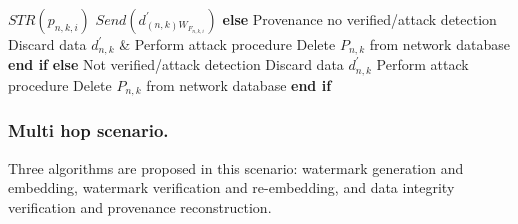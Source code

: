 \documentclass{llncs}
\begin{document}
\begin{algorithm}[!htbp]
\begin{algorithmic}[1]
    \State \hspace{20pt} $STR(p_{n,k,i})$  
    \State \hspace{20pt} $Send(d^{'}_{(n,k)W_{F_{n,k,i}}})$
    \State \hspace{10pt} \textbf{else} 
    \State \hspace{20pt} Provenance no verified/attack detection
    \State \hspace{20pt} Discard data $d^{'}_{n,k}$ \& Perform attack procedure
    \State \hspace{20pt} Delete $P_{n,k}$ from network database
    \State \hspace{10pt} \textbf{end if}
    \State \textbf{else} 
    \State \hspace{10pt} Not verified/attack detection
    \State \hspace{10pt} Discard data $d^{'}_{n,k}$
    \State \hspace{10pt} Perform attack procedure
    \State \hspace{10pt} Delete $P_{n,k}$ from network database
    \State \textbf{end if}
    \EndProcedure
    \end{algorithmic}
    \end{algorithm}

    
    



\subsubsection{Multi hop scenario.}
Three algorithms are proposed in this scenario: watermark generation and embedding, watermark verification and re-embedding, and data integrity verification and provenance reconstruction. 
\end{document}
